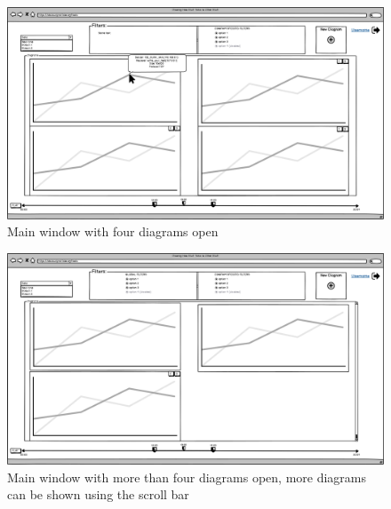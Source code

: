 \documentclass[twoside, english, draft]{Pflichtenheft}
\begin{document}
\begin{figure}[h]
\centering
\label{fig:mainWindow3}
\includegraphics[width=\textwidth]{Images/05MW.png}
	\caption{Main window with four diagrams open}
	\label{fig:mainWindow3}
\end{figure}

\begin{figure}[h]
\centering
\label{fig:mainWindow4}
\includegraphics[width=\textwidth]{Images/06MW.png}
	\caption{Main window with more than four diagrams open, more diagrams can be shown using the scroll bar}
	\label{fig:mainWindow4}
\end{figure}

\clearpage


\end{document}
